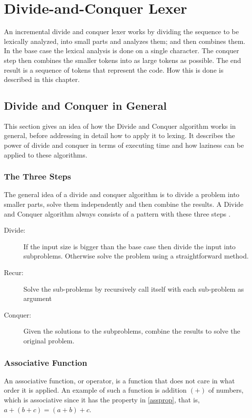 \chapter{Divide-and-Conquer Lexer \label{chap:divconqlexer}}
An incremental divide and conquer lexer works by dividing the sequence to be
lexically analyzed, into small parts and analyzes them; and then combines them.
In the base case the lexical analysis is done on a single character. The
conquer step then combines the smaller tokens into as large tokens as possible.
The end result is a sequence of tokens that represent the code. How this is done
is described in this chapter.

\section{Divide and Conquer in General \label{sec:divconq}}
This section gives an idea of how the Divide and Conquer algorithm
works in general, before addressing in detail how to apply it to lexing. It
describes the power of divide and conquer in terms of executing time and how
laziness can be applied to these algorithms.

\subsection{The Three Steps}
The general idea of a divide and conquer algorithm is to divide a problem into
smaller parts, solve them independently and then combine the results. A Divide
and Conquer algorithm always consists of a pattern with these three steps
\cite{Goodrich}.
\begin{description}
\item[Divide:] If the input size is bigger than the base case then divide the
input into subproblems. Otherwise solve the problem using a straightforward
method.
\item[Recur:] Solve the sub-problems by recursively call itself with each
sub-problem as argument
\item[Conquer:] Given the solutions to the subproblems, combine the results to
solve the original problem.
\end{description}

\subsection{Associative Function}
An associative function, or operator, is a function that does not care in what
order it is applied. An example of such a function is addition $(+)$ of numbers,
which is associative since it has the property in \cref{assprop}, that is,
$a+(b+c)=(a+b)+c$.

